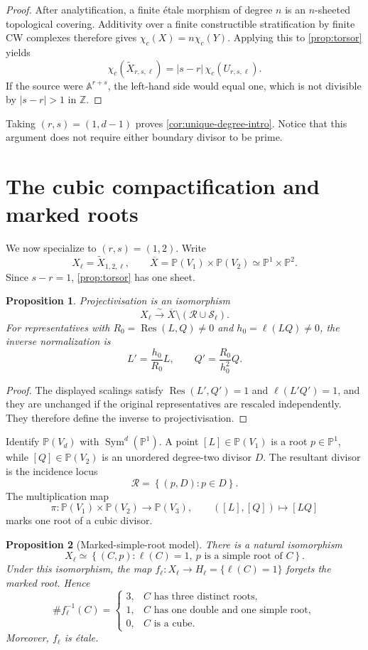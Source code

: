 \documentclass[11pt,reqno]{amsart}
\newtheorem{proposition}[proposition]{Proposition}
\theoremstyle{definition}
\theoremstyle{remark}
\newcommand{\A}{\mathbb A}
\newcommand{\Pj}{\mathbb P}
\newcommand{\Z}{\mathbb Z}
\newcommand{\cR}{\mathcal R}
\newcommand{\cS}{\mathcal S}
\newcommand{\Res}{\operatorname{Res}}
\newcommand{\Sym}{\operatorname{Sym}}
\newcommand{\abs}[1]{\lvert #1\rvert}
\newcommand{\set}[1]{\left\{#1\right\}}
\begin{document}
\begin{proof}
After analytification, a finite étale morphism of degree $n$ is an
$n$-sheeted topological covering.  Additivity over a finite
constructible stratification by finite CW complexes therefore gives
$\chi_c(X)=n\chi_c(Y)$.  Applying this to \cref{prop:torsor} yields
\[
 \chi_c(\widetilde X_{r,s,\ell})
 =\abs{s-r}\,\chi_c(U_{r,s,\ell}).
\]
If the source were $\A^{r+s}$, the left-hand side would equal one, which
is not divisible by $\abs{s-r}>1$ in $\Z$.
\end{proof}

Taking $(r,s)=(1,d-1)$ proves \cref{cor:unique-degree-intro}.  Notice
that this argument does not require either boundary divisor to be prime.

\section{The cubic compactification and marked roots}

We now specialize to $(r,s)=(1,2)$.  Write
\[
 X_\ell=\widetilde X_{1,2,\ell},
 \qquad
 \overline X=\Pj(V_1)\times\Pj(V_2)\simeq\Pj^1\times\Pj^2.
\]
Since $s-r=1$, \cref{prop:torsor} has one sheet.

\begin{proposition}\label{prop:projective-complement}
Projectivisation is an isomorphism
\[
 X_\ell\xrightarrow{\sim}
 \overline X\setminus(\cR\cup\cS_\ell).
\]
For representatives with
$R_0=\Res(L,Q)\ne0$ and $h_0=\ell(LQ)\ne0$, the inverse normalization is
\[
 L'=\frac{h_0}{R_0}L,
 \qquad
 Q'=\frac{R_0}{h_0^2}Q.
\]
\end{proposition}

\begin{proof}
The displayed scalings satisfy
$\Res(L',Q')=1$ and $\ell(L'Q')=1$, and they are unchanged if the original
representatives are rescaled independently.  They therefore define the
inverse to projectivisation.
\end{proof}

Identify $\Pj(V_d)$ with $\Sym^d(\Pj^1)$.  A point $[L]\in\Pj(V_1)$ is a
root $p\in\Pj^1$, while $[Q]\in\Pj(V_2)$ is an unordered degree-two
divisor $D$.  The resultant divisor is the incidence locus
\[
 \cR=\set{(p,D):p\in D}.
\]
The multiplication map
\[
 \pi:\Pj(V_1)\times\Pj(V_2)\longrightarrow\Pj(V_3),
 \qquad ([L],[Q])\longmapsto[LQ]
\]
marks one root of a cubic divisor.

\begin{proposition}[Marked-simple-root model]\label{prop:marked-root}
There is a natural isomorphism
\[
 X_\ell\simeq
 \set{(C,p):\ell(C)=1,\ p\text{ is a simple root of }C}.
\]
Under this isomorphism, the map
$f_\ell:X_\ell\to H_\ell=\{\ell(C)=1\}$ forgets the marked root.  Hence
\[
 \#f_\ell^{-1}(C)=
 \begin{cases}
 3,&C\text{ has three distinct roots},\\
 1,&C\text{ has one double and one simple root},\\
 0,&C\text{ is a cube}.
 \end{cases}
\]
Moreover, $f_\ell$ is étale.
\end{proposition}
\end{document}

